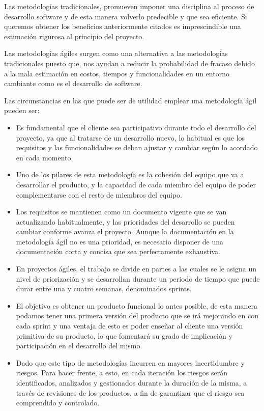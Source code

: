 Las metodologías tradicionales, promueven imponer una disciplina al proceso de desarrollo software y de esta manera volverlo predecible y que sea eficiente. Si queremos obtener los beneficios anteriormente citados es imprescindible una estimación rigurosa al principio del proyecto.

Las metodologías ágiles surgen como una alternativa a las metodologías tradicionales puesto que, nos ayudan a reducir la probabilidad de fracaso debido a la mala estimación en costos, tiempos y funcionalidades en un entorno cambiante como es el desarrollo de software.

Las circunstancias en las que puede ser de utilidad emplear una metodología ágil pueden ser:

\begin{itemize}

\item Es fundamental que el cliente sea participativo durante todo el desarrollo del proyecto, ya que al tratarse de un desarrollo nuevo, lo habitual es que los requisitos y las funcionalidades se deban ajustar y cambiar según lo acordado en cada momento.

\item Uno de los pilares de esta metodología es la cohesión del equipo que va a desarrollar el producto, y la capacidad de cada miembro del equipo de poder complementarse con el resto de miembros del equipo.

\item Los requisitos se mantienen como un documento vigente que se van actualizando habitualmente, y las prioridades del desarrollo se pueden cambiar conforme avanza el proyecto. Aunque la documentación en la metodología ágil no es una prioridad, es necesario disponer de una documentación corta y concisa que sea perfectamente exhaustiva.

\item En proyectos ágiles, el trabajo se divide en partes a las cuales se le asigna un nivel de priorización y se desarrollan durante un periodo de tiempo que puede durar entre una y cuatro semanas, denominados sprints. 

\item El objetivo es obtener un producto funcional lo antes posible, de esta manera podamos tener una primera versión del producto que se irá mejorando en con cada sprint y una ventaja de esto es poder enseñar al cliente una versión primitiva de su producto, lo que fomentará su grado de implicación y participación en el desarrollo del mismo. 

\item Dado que este tipo de metodologías incurren en mayores incertidumbre y riesgos. Para hacer frente, a esto, en cada iteración los riesgos serán identificados, analizados y gestionados durante la duración de la misma, a través de revisiones de los productos, a fin de garantizar que el riesgo sea comprendido y controlado.  

\end{itemize}

